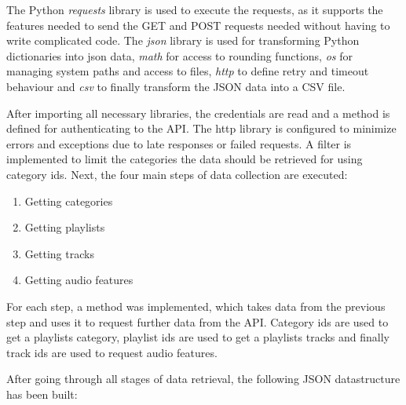 The Python \emph{requests} library is used to execute the requests, as it supports the features needed to send the GET and POST
requests needed without having to write complicated code.
The \emph{json} library is used for transforming Python dictionaries into json data, \emph{math} for access to rounding functions,
\emph{os} for managing system paths and access to files, \emph{http} to define retry and timeout behaviour and \emph{csv}
to finally transform the JSON data into a CSV file.

After importing all necessary libraries, the credentials are read and a method is defined for authenticating to the API.
The http library is configured to minimize errors and exceptions due to late responses or failed requests.
A filter is implemented to limit the categories the data should be retrieved for using category ids.
Next, the four main steps of data collection are executed:

\begin{enumerate}
    \item Getting categories
    \item Getting playlists
    \item Getting tracks
    \item Getting audio features
\end{enumerate}

For each step, a method was implemented, which takes data from the previous step and uses it to request further data from the
API. Category ids are used to get a playlists category, playlist ids are used to get a playlists tracks and finally track ids
are used to request audio features.

After going through all stages of data retrieval, the following JSON datastructure has been built:

